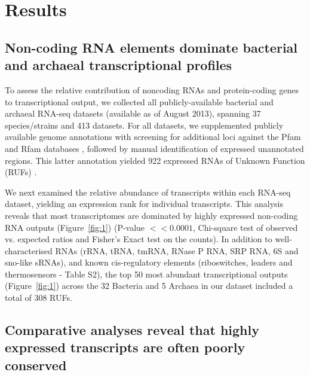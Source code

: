 \documentclass[10pt]{article}
\begin{document}
\section*{Results}

\subsection*{Non-coding RNA elements dominate bacterial and archaeal transcriptional profiles}

To assess the relative contribution of noncoding RNAs and
protein-coding genes to transcriptional output, we collected all
publicly-available bacterial and archaeal RNA-seq datasets (available
as of August 2013), spanning 37 species/strains and 413 datasets. For
all datasets, we supplemented publicly available genome annotations
with screening for additional loci against the Pfam and Rfam databases
\cite{Punta:2012,Finn:2014,Gardner:2011,Burge:2013}, followed by
manual identification of expressed unannotated regions. This latter
annotation yielded 922 expressed RNAs of Unknown Function (RUFs)
\cite{McCutcheon:2003}.

We next examined the relative abundance of transcripts within each
RNA-seq dataset, yielding an expression rank for individual
transcripts. This analysis reveals that most transcriptomes are
dominated by highly expressed non-coding RNA outputs
(Figure~\ref{fig:1}) (P-value $<< 0.0001$, Chi-square test of observed
vs. expected ratios and Fisher’s Exact test on the counts). In
addition to well-characterised RNAs (rRNA, tRNA, tmRNA, RNase P RNA,
SRP RNA, 6S and sno-like sRNAs), and known cis-regulatory elements
(riboswitches, leaders and thermosensors - Table S2), the top 50
most abundant transcriptional outputs (Figure~\ref{fig:1}) across the
32 Bacteria and 5 Archaea in our dataset included a total of 308 RUFs.

\subsection*{Comparative analyses reveal that highly expressed transcripts are often poorly conserved}
\end{document}
